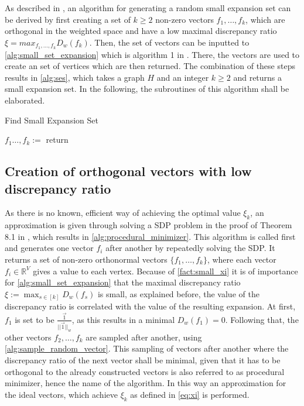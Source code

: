 As described in \cite{ChanLTZ16}, an algorithm for generating a random small expansion set can be derived by first creating a set of $k\ge2$  non-zero vectors $f_1, \ldots, f_k$, which are orthogonal in the weighted space and have a low maximal discrepancy ratio $\xi = max_{f_1, \ldots, f_k} D_w(f_k)$.
Then, the set of vectors can be inputted to \cref{alg:small_set_expansion} which is algorithm 1 in \cite{ChanLTZ16}. There, the vectors are used to create an set of vertices which are then returned. The combination of these steps results in \cref{alg:ses}, which takes a graph $H$ and an integer $k \ge 2$ and returns a small expansion set. In the following, the subroutines of this algorithm shall be elaborated.

\begin{algorithm}[htpb]
	\caption{Find Small Expansion Set \label{alg:ses}} 
	\begin{algorithmic}
		\State $f_1 \ldots, f_k := $
		\State return 
		\EndFunction 
	\end{algorithmic}
\end{algorithm}	

\subsection{Creation of orthogonal vectors with low discrepancy ratio}
As there is no known, efficient way of achieving the optimal value $\xi_k$, an approximation is given through solving a SDP problem in the proof of Theorem 8.1 in \cite{ChanLTZ16}, which results in \cref{alg:procedural_minimizer}. This algorithm is called first and generates one vector $f_i$ after another by repeatedly solving the SDP. 
It returns a set of non-zero orthonormal vectors $\{f_1, \ldots, f_k\}$, where each vector $f_i \in \mathbb{R}^V$ gives a value to each vertex. Because of \cref{fact:small_xi} it is of importance for \cref{alg:small_set_expansion} that the maximal discrepancy ratio $\xi := \max_{s \in [k]} D_w(f_s)$ is small, as explained before, the value of the discrepancy ratio is correlated with the value of the resulting expansion.
At first, $f_1$ is set to be $\frac{\vec{1}}{||\vec{1}||_w}$, as this results in a minimal $D_w(f_1) =0$. Following that, the other vectors $f_2, \ldots, f_k$ are sampled after another, using \cref{alg:sample_random_vector}. This sampling of vectors after another where the discrepancy ratio of the next vector shall be minimal, given that it has to be orthogonal to the already constructed vectors is also referred to as procedural minimizer, hence the name of the algorithm. In this way an approximation for the ideal vectors, which achieve $\xi_k$ as defined in \cref{eq:xi} is performed.

